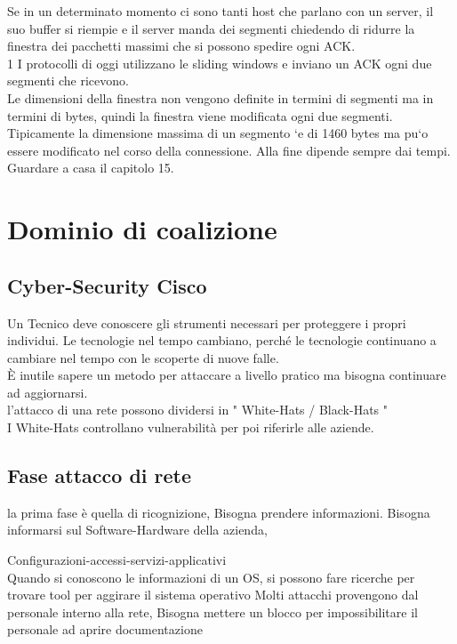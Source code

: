 \documentclass{article}
\begin{document}
Se in un determinato momento ci sono tanti host che parlano con un server,
il suo buffer si riempie e il server manda dei segmenti chiedendo di ridurre la
finestra dei pacchetti massimi che si possono spedire ogni ACK.\\
1
I protocolli di oggi utilizzano le sliding windows e inviano un ACK ogni due
segmenti che ricevono.\\
Le dimensioni della finestra non vengono definite in termini di segmenti ma
in termini di bytes, quindi la finestra viene modificata ogni due segmenti.
Tipicamente la dimensione massima di un segmento `e di 1460 bytes ma pu`o
essere modificato nel corso della connessione.
Alla fine dipende sempre dai tempi.
Guardare a casa il capitolo 15.\\

\section{Dominio di coalizione}

\subsection{Cyber-Security Cisco}

Un Tecnico deve conoscere gli strumenti necessari per proteggere i propri individui.
Le tecnologie nel tempo cambiano, perché le tecnologie continuano a cambiare nel tempo con le scoperte di nuove falle.
\\È inutile sapere un metodo per attaccare a livello pratico ma bisogna continuare ad aggiornarsi.
\\l'attacco di una rete possono dividersi in " White-Hats / Black-Hats " 
\\I White-Hats controllano vulnerabilità per poi riferirle alle aziende.

\subsection{Fase attacco di rete}

la prima fase è quella di ricognizione, Bisogna prendere informazioni. 
Bisogna informarsi sul Software-Hardware della azienda, 

Configurazioni-accessi-servizi-applicativi
\\Quando si conoscono le informazioni di un OS, si possono fare ricerche per trovare tool per aggirare il sistema operativo
Molti attacchi provengono dal personale interno alla rete, Bisogna mettere un blocco per impossibilitare il personale ad aprire documentazione
\end{document}
